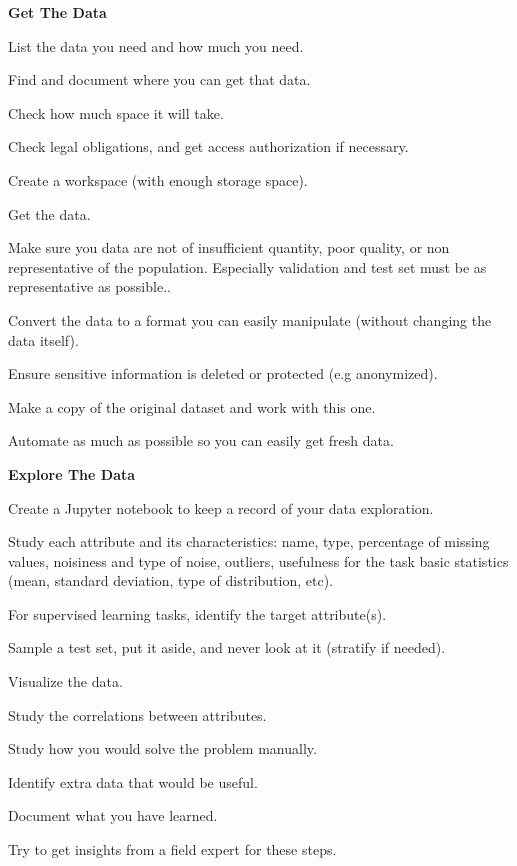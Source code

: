 \item \textbf{Get The Data}
\bit
\item List the data you need and how much you need.
\item Find and document where you can get that data.
\item Check how much space it will take.
\item Check legal obligations, and get access authorization if necessary.
\item Create a workspace (with enough storage space).
\item Get the data.
\item Make sure you data are not of insufficient quantity, poor quality, or non representative of the population.
Especially validation and test set must be as representative as possible..
\item Convert the data to a format you can easily manipulate (without changing the data itself).
\item Ensure sensitive information is deleted or protected (e.g anonymized).
\item Make a copy of the original dataset and work with this one.
\item Automate as much as possible so you can easily get fresh data.
\eit

\item \textbf{Explore The Data}
\bit
\item Create a Jupyter notebook to keep a record of your data exploration.
\item Study each attribute and its characteristics: name, type, percentage of missing values, noisiness and type of
noise, outliers, usefulness for the task basic statistics (mean, standard deviation, type of distribution, etc).
\item For supervised learning tasks, identify the target attribute(s).
\item Sample a test set, put it aside, and never look at it (stratify if needed).
\item Visualize the data.
\item Study the correlations between attributes.
\item Study how you would solve the problem manually.
\item Identify extra data that would be useful.
\item Document what you have learned.
\item Try to get insights from a field expert for these steps.
\eit

